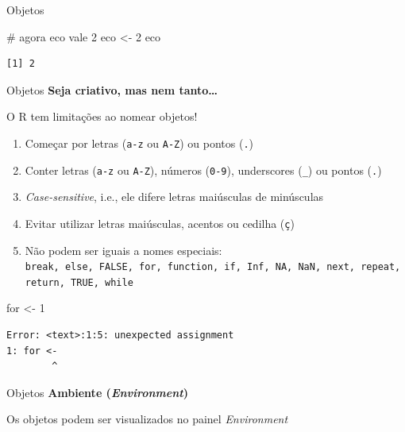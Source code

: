 \documentclass[
  ignorenonframetext,
]{beamer}
\newenvironment{Shaded}{\begin{snugshade}}{\end{snugshade}}
\newcommand{\CommentTok}[1]{\textcolor[rgb]{0.37,0.37,0.37}{#1}}
\newcommand{\ControlFlowTok}[1]{\textcolor[rgb]{0.00,0.23,0.31}{#1}}
\newcommand{\DecValTok}[1]{\textcolor[rgb]{0.68,0.00,0.00}{#1}}
\newcommand{\NormalTok}[1]{\textcolor[rgb]{0.00,0.23,0.31}{#1}}
\newcommand{\OtherTok}[1]{\textcolor[rgb]{0.00,0.23,0.31}{#1}}
\begin{document}
\begin{frame}[fragile]{}
\begin{block}{Objetos}
\begin{Shaded}
\begin{Highlighting}[]
\CommentTok{\# agora eco vale 2}
\NormalTok{eco }\OtherTok{\textless{}{-}} \DecValTok{2} 
\NormalTok{eco}
\end{Highlighting}
\end{Shaded}

\begin{verbatim}
[1] 2
\end{verbatim}
\end{block}

\begin{block}{Objetos}
\protect\hypertarget{objetos-4}{}
\textbf{Seja criativo, mas nem tanto\ldots{}}

O R tem limitações ao nomear objetos!

\begin{enumerate}
\item
  Começar por letras (\texttt{a-z} ou \texttt{A-Z}) ou pontos
  (\texttt{.})
\item
  Conter letras (\texttt{a-z} ou \texttt{A-Z}), números (\texttt{0-9}),
  underscores (\texttt{\_}) ou pontos (\texttt{.})
\item
  \emph{Case-sensitive}, i.e., ele difere letras maiúsculas de
  minúsculas
\item
  Evitar utilizar letras maiúsculas, acentos ou cedilha (\texttt{ç})
\item
  Não podem ser iguais a nomes especiais:
  \texttt{break,\ else,\ FALSE,\ for,\ function,\ if,\ Inf,\ NA,\ NaN,\ next,\ repeat,\ return,\ TRUE,\ while}
\end{enumerate}

\begin{Shaded}
\begin{Highlighting}[]
\ControlFlowTok{for} \OtherTok{\textless{}{-}} \DecValTok{1}
\end{Highlighting}
\end{Shaded}

\begin{verbatim}
Error: <text>:1:5: unexpected assignment
1: for <-
        ^
\end{verbatim}
\end{block}

\begin{block}{Objetos}
\protect\hypertarget{objetos-5}{}
\textbf{Ambiente (\emph{Environment})}

Os objetos podem ser visualizados no painel \emph{Environment}
\end{block}


\end{frame}
\end{document}
